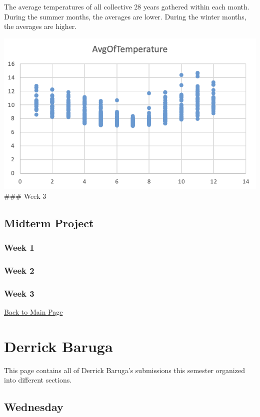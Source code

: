 \documentclass[
  letterpaper,
  DIV=11,
  numbers=noendperiod]{scrreprt}
\begin{document}
The average temperatures of all collective 28 years gathered within each
month. During the summer months, the averages are lower. During the
winter months, the averages are higher.

\includegraphics{TemperatureMonthAverage.png} \#\#\# Week 3

\section{Midterm Project}\label{midterm-project-1}

\subsection{Week 1}\label{week-1-5}

\subsection{Week 2}\label{week-2-5}

\subsection{Week 3}\label{week-3-4}

\href{introduction.html}{Back to Main Page}


\chapter{Derrick Baruga}\label{derrick-baruga}

This page contains all of Derrick Baruga's submissions this semester
organized into different sections.

\section{Wednesday}\label{wednesday-2}
\end{document}
